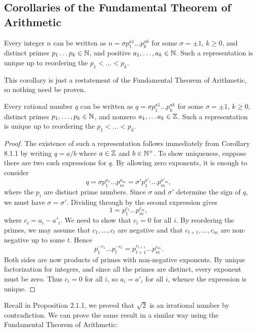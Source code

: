 \subsection{Corollaries of the Fundamental Theorem of Arithmetic}

\begin{corrbox}
   Every integer $n$ can be written as $n = \sigma p_1^{a1} \dots p_k^{ak}$ for some $\sigma = \pm 1$, $k \geq 0$, and distinct primes $p_1 \dots p_k \in \mathbb{N}$, and positive $a_1, \dots, a_k \in \mathbb{N}$. Such a representation is unique up to reordering the $p_1 < \dots < p_k$. 
\end{corrbox}

This corollary is just a restatement of the Fundamental Theorem of Arithmetic, so nothing need be proven.

\begin{corrbox}
   Every rational number $q$ can be written as $q = \sigma p_1^{a1} \dots p_k^{ak}$ for some $\sigma = \pm 1$, $k \geq 0$, distinct primes $p_1, \dots, p_k \in \mathbb{N}$, and nonzero $a_1, \dots a_k \in \mathbb{Z}$. Such a representation is unique up to reordering the $p_1 < \dots < p_k$. 
\end{corrbox}

\begin{proof}
   The existence of such a representation follows immediately from Corollary 8.1.1 by writing $q = a/b$ where $a \in \mathbb{Z}$ and $b \in \mathbb{N}^+$. To show uniqueness, suppose there are two such expressions for $q$. By allowing zero
   exponents, it is enough to consider
   \[
   q = \sigma p_1^{a_1}\dots p_m^{a_m}
   = \sigma' p_1^{a'_1}\dots p_m^{a'_m},
   \]
   where the $p_i$ are distinct prime numbers. Since $\sigma$ and $\sigma'$
   determine the sign of $q$, we must have $\sigma=\sigma'$. Dividing through
   by the second expression gives
   \[
   1 = p_1^{c_1}\dots p_m^{c_m},
   \]
   where $c_i=a_i-a'_i$. We need to show that $c_i=0$ for all $i$.  By reordering the primes, we may assume that $c_1,\dots,c_t$ are  negative and that $c_{t+1},\dots,c_m$ are non-negative up to some $t$. Hence
   \[
   p_1^{-c_1}\dots p_t^{-c_t}
   =
   p_{t+1}^{c_{t+1}}\dots p_m^{c_m}.
   \]
   Both sides are now products of primes with non-negative exponents. By
   unique factorization for integers, and since all the primes are distinct,
   every exponent must be zero. Thus $c_i=0$ for all $i$, so $a_i=a'_i$
   for all $i$, whence the expression is unique. 
\end{proof}

Recall in Proposition 2.1.1, we proved that $\sqrt{2}$ is an irrational number by contradiction. We can prove the same result in a similar way using the Fundamental Theorem of Arithmetic:


